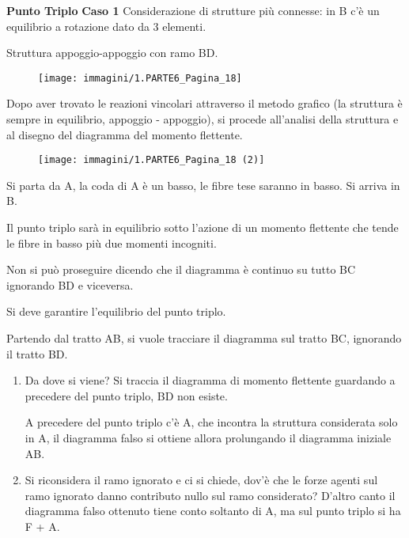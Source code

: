 \documentclass{article}
\begin{document}
\begin{adjustwidth}{2in}{}
	
	
	
	
	
	
	
	 
	
{\Large \textbf{Punto Triplo}} \mbox{} \newline
\textbf{Caso 1}\newline
Considerazione di strutture più connesse: in B c'è un equilibrio a rotazione dato da 3 elementi.

Struttura appoggio-appoggio con ramo BD.
\begin{figure}[H]
	\centering
	\texttt{[image: immagini/1.PARTE6\_Pagina\_18]}
\end{figure}
	Dopo aver trovato le reazioni vincolari attraverso il metodo grafico (la struttura è sempre in equilibrio, appoggio - appoggio), si procede all'analisi della struttura e al disegno del diagramma del momento flettente. 
	
	\begin{figure}[H]
		\centering
		\texttt{[image: immagini/1.PARTE6\_Pagina\_18 (2)]}
	\end{figure}
	
	Si parta da A, la coda di A è un basso, le fibre tese saranno in basso. Si arriva in B. \newline 
	
	Il punto triplo sarà in equilibrio sotto l'azione di un momento flettente che tende le fibre in basso più due momenti incogniti. 
	
	Non si può proseguire dicendo che il diagramma è continuo su tutto BC ignorando BD e viceversa. 
	
	Si deve garantire l'equilibrio del punto triplo. \newline 
	
	Partendo dal tratto AB, si vuole tracciare il diagramma sul tratto BC, ignorando il tratto BD.
	
	\begin{enumerate}
		\item Da dove si viene? Si traccia il diagramma di momento flettente guardando a precedere del punto triplo, BD non esiste. 
		
		A precedere del punto triplo c'è A, che incontra la struttura considerata solo in A, il diagramma falso si ottiene allora prolungando il diagramma iniziale AB. 
		
		\item Si riconsidera il ramo ignorato e ci si chiede, dov'è che le forze agenti sul ramo ignorato danno contributo nullo sul ramo considerato? D'altro canto il diagramma falso ottenuto tiene conto soltanto di A, ma sul punto triplo si ha F + A. \newline 
		

\end{enumerate}
\end{adjustwidth}
\end{document}
